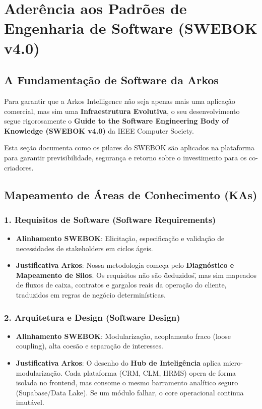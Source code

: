 \pagebreak
\chapter{Aderência aos Padrões de Engenharia de Software (SWEBOK v4.0)}

\section{A Fundamentação de Software da Arkos}
Para garantir que a Arkos Intelligence não seja apenas mais uma aplicação comercial, mas sim uma \textbf{Infraestrutura Evolutiva}, o seu desenvolvimento segue rigorosamente o \textbf{Guide to the Software Engineering Body of Knowledge (SWEBOK v4.0)} da IEEE Computer Society. 

Esta seção documenta como os pilares do SWEBOK são aplicados na plataforma para garantir previsibilidade, segurança e retorno sobre o investimento para os co-criadores.

\section{Mapeamento de Áreas de Conhecimento (KAs)}

\subsection{1. Requisitos de Software (Software Requirements)}
\begin{itemize}
    \item \textbf{Alinhamento SWEBOK}: Elicitação, especificação e validação de necessidades de stakeholders em ciclos ágeis.
    \item \textbf{Justificativa Arkos}: Nossa metodologia começa pelo \textbf{Diagnóstico e Mapeamento de Silos}. Os requisitos não são \"deduzidos\", mas sim mapeados de fluxos de caixa, contratos e gargalos reais da operação do cliente, traduzidos em regras de negócio determinísticas.
\end{itemize}

\subsection{2. Arquitetura e Design (Software Design)}
\begin{itemize}
    \item \textbf{Alinhamento SWEBOK}: Modularização, acoplamento fraco (loose coupling), alta coesão e separação de interesses.
    \item \textbf{Justificativa Arkos}: O desenho do \textbf{Hub de Inteligência} aplica micro-modularização. Cada plataforma (CRM, CLM, HRMS) opera de forma isolada no frontend, mas consome o mesmo barramento analítico seguro (Supabase/Data Lake). Se um módulo falhar, o core operacional continua imutável.
\end{itemize}

